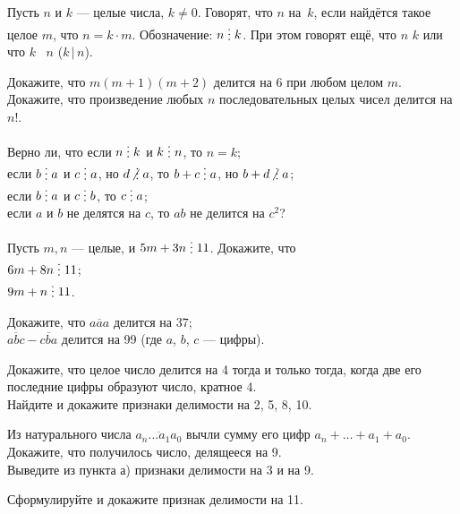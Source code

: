 \documentclass[a4paper,12pt]{article}
\newcommand{\del}{\mathrel{\raisebox{-.3 ex}{${\vdots}$}}}
\begin{document}


\smallskip

Пусть $n$ и $k$ --- целые числа, $k\ne0$. Говорят, что $n$ 
на~$k$, если найдётся такое целое $m$,
что $n=k\cdot m$. Обозначение: $n\del k$.
При этом говорят ещ\"е, что $n$  $k$
или что $k$ ~$n$ ($k\,|\,n$).

Докажите, что $m(m+1)(m+2)$ делится на 6 при любом целом $m$.\\
Докажите, что произведение любых $n$ последовательных
целых чисел делится на $n!$.

 Верно ли, что
если $n\del k$ и $k\del n$, то $n=k$;\\
если $b\del a$ и $c\del a$, но $d\!\not\,\,\del a$, то $b+c\del a$, но
$b+d\!\not\,\,\del a$;\\
если $b\del a$ и $c\del b$, то $c\del a$;\\
если $a$ и $b$ не делятся на $c$, то $ab$ не делится на $c^2$?

Пусть $m,n$ --- целые, и $5m+3n\del11$. Докажите, что\\
$6m+8n\del11$;\\
  $9m+n\del11$.

Докажите, что
$\overline{aaa}$ делится на $37$;\\
$\overline{abc}-\overline{cba}$ делится на 99 (где $a$, $b$, $c$ --- цифры).

 Докажите, что целое число делится на 4 тогда и только тогда,
когда две его последние цифры образуют число, кратное 4.\\
 Найдите и докажите признаки делимости на 2, 5, 8, 10.

Из натурального числа $\overline{a_n\ldots a_1a_0}$ вычли сумму
его цифр $a_n+\ldots+a_1+a_0$. Докажите, что получилось число,
делящееся на 9.\\
Выведите из пункта а) признаки делимости на 3 и на 9.

Сформулируйте и докажите признак делимости на 11.
\end{document}
